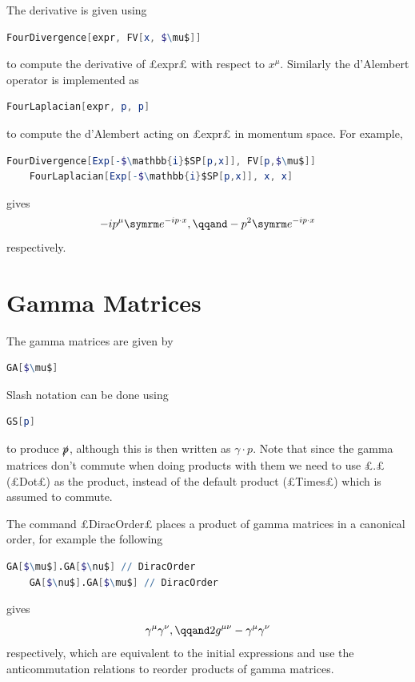 The derivative is given using
\begin{lstlisting}[language=mathematica, gobble=4, mathescape]
    FourDivergence[expr, FV[x, $\mu$]]
\end{lstlisting}
to compute the derivative of £expr£ with respect to \(x^\mu\).
Similarly the d'Alembert operator is implemented as
\begin{lstlisting}[language=mathematica, gobble=4, mathescape]
    FourLaplacian[expr, p, p]
\end{lstlisting}
to compute the d'Alembert acting on £expr£ in momentum space.
For example,
\begin{lstlisting}[language=mathematica, gobble=4, mathescape]
    FourDivergence[Exp[-$\mathbb{i}$SP[p,x]], FV[p,$\mu$]]
    FourLaplacian[Exp[-$\mathbb{i}$SP[p,x]], x, x]
\end{lstlisting}
gives
\begin{equation}
    -ip^\mu \e^{-ip\cdot x}, \qqand -p^2 \e^{-ip\cdot x}
\end{equation}
respectively.

\section{Gamma Matrices}
The gamma matrices are given by
\begin{lstlisting}[language=mathematica, gobble=4, mathescape]
    GA[$\mu$]
\end{lstlisting}
Slash notation can be done using
\begin{lstlisting}[language=mathematica, gobble=4, mathescape]
    GS[p]
\end{lstlisting}
to produce \(\slashed{p}\), although this is then written as \(\gamma \cdot p\).
Note that since the gamma matrices don't commute when doing products with them we need to use £.£ (£Dot£) as the product, instead of the default product (£Times£) which is assumed to commute.

The command £DiracOrder£ places a product of gamma matrices in a canonical order, for example the following
\begin{lstlisting}[language=mathematica, gobble=4, mathescape]
    GA[$\mu$].GA[$\nu$] // DiracOrder
    GA[$\nu$].GA[$\mu$] // DiracOrder
\end{lstlisting}
gives
\begin{equation}
    \gamma^\mu\gamma^\nu, \qqand 2g^{\mu\nu} - \gamma^\mu\gamma^\nu
\end{equation}
respectively, which are equivalent to the initial expressions and use the anticommutation relations to reorder products of gamma matrices.

